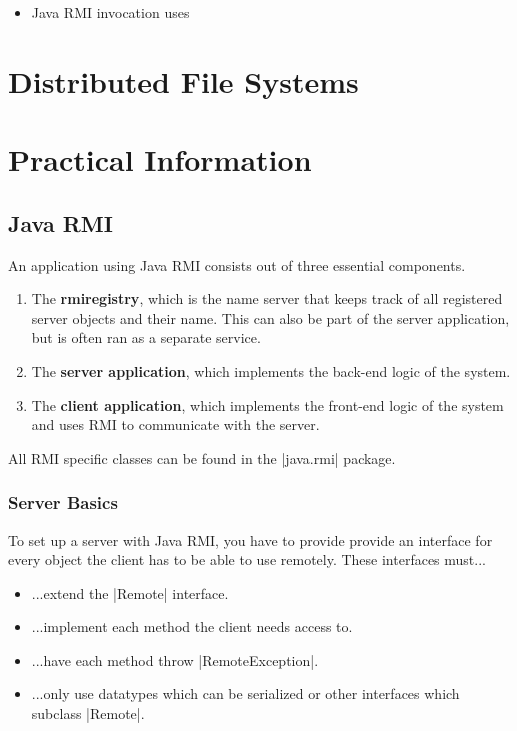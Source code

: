 \documentclass[a4paper]{article}
\begin{document}
\begin{itemize}
\item Java RMI invocation uses 
\end{itemize}


\newpage

\section{Distributed File Systems}



\newpage

\section{Practical Information}

\subsection{Java RMI}

An application using Java RMI consists out of three essential components.

\begin{enumerate}
\item The \textbf{rmiregistry}, which is the name server that keeps track of all registered server objects and their name. This can also be part of the server application, but is often ran as a separate service.
\item The \textbf{server application}, which implements the back-end logic of the system.
\item The \textbf{client application}, which implements the front-end logic of the system and uses RMI to communicate with the server.
\end{enumerate}

All RMI specific classes can be found in the |java.rmi| package.

\subsubsection{Server Basics}

To set up a server with Java RMI, you have to provide provide an interface for every object the client has to be able to use remotely. These interfaces must...

\begin{itemize}
\item ...extend the |Remote| interface.
\item ...implement each method the client needs access to.
\item ...have each method throw |RemoteException|.
\item ...only use datatypes which can be serialized or other interfaces which subclass |Remote|.
\end{itemize}
\end{document}
